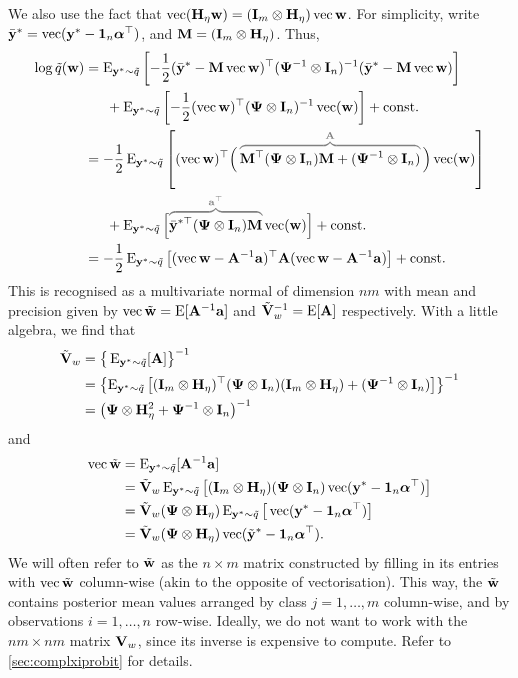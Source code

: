 We also use the fact that $\operatorname{vec} ({\mathbf H}_\eta{\mathbf w}) = ({\mathbf I}_m \otimes {\mathbf H}_\eta)\operatorname{vec}{\mathbf w}$.  %
For simplicity, write $\bar{{\mathbf y}}^* = \operatorname{vec}({\mathbf y}^* - {\mathbf 1}_n{\bm\alpha}^\top)$, and ${\mathbf M} = ({\mathbf I}_m \otimes {\mathbf H}_\eta)$.
Thus,
\begin{align*}
  \log \tilde q(\bw) 
  &= \E_{\by^*\sim \tilde q} \left[ 
  -\half (\bar\by^* - \bM\vecc\bw )^\top(\bPsi^{-1} \otimes \bI_n)^{-1} (\bar\by^* - \bM\vecc\bw )
  \right] \\
  &\phantom{==} + \E_{\by^*\sim \tilde q} \left[ 
  -\half (\vecc \bw )^\top(\bPsi \otimes \bI_n)^{-1} \vecc (\bw ) \right] + \const \\
  &= -\half\E_{\by^*\sim \tilde q} \left[ 
  (\vecc\bw)^\top \Big( \,
  \myoverbrace{\bM^\top(\bPsi \otimes \bI_n)\bM + (\bPsi^{-1} \otimes \bI_n)}{\bA} 
  \, \Big) \vecc (\bw )
  \right] \\
  &\phantom{==} + \E_{\by^*\sim \tilde q} \Big[ 
  \myoverbrace{\bar\by^{*\top} (\bPsi \otimes \bI_n) \bM}{\ba^\top} \vecc (\bw )
  \Big] + \const \\
  &= -\half\E_{\by^*\sim \tilde q} \left[
  (\vecc\bw - \bA^{-1}\ba)^\top \bA (\vecc\bw - \bA^{-1}\ba)
  \right] + \const
\end{align*}
This is recognised as a multivariate normal of dimension $nm$ with mean and precision given by $\operatorname{vec} \tilde{{\mathbf w}} = \operatorname{E}[{\mathbf A}^{-1}{\mathbf a}]$ and $\tilde{{\mathbf V}}_w ^{-1}= \operatorname{E}[{\mathbf A}]$ respectively.
With a little algebra, we find that
\begin{align*}
  \tilde{{\mathbf V}}_w 
  &= \big\{ \operatorname{E}_{{\mathbf y}^*\sim \tilde q} [{\mathbf A}] \big\}^{-1} \\
  &= \left\{ \operatorname{E}_{{\mathbf y}^*\sim \tilde q} \left[({\mathbf I}_m \otimes {\mathbf H}_\eta)^\top({\bm\Psi} \otimes {\mathbf I}_n)({\mathbf I}_m \otimes {\mathbf H}_\eta) + ({\bm\Psi}^{-1} \otimes {\mathbf I}_n) \right] \right\}^{-1} \\
  &= \big( {\bm\Psi} \otimes {\mathbf H}_\eta^2 + {\bm\Psi}^{-1} \otimes {\mathbf I}_n \big)^{-1}
\end{align*}
and 
\begin{align*}
  \operatorname{vec} \tilde{\mathbf w} 
  &= \operatorname{E}_{{\mathbf y}^*\sim \tilde q} [{\mathbf A}^{-1}{\mathbf a}] \\
  &= \tilde{{\mathbf V}}_w \operatorname{E}_{{\mathbf y}^*\sim \tilde q} \big[({\mathbf I}_m \otimes {\mathbf H}_\eta) ({\bm\Psi} \otimes {\mathbf I}_n) \operatorname{vec}({\mathbf y}^* - {\mathbf 1}_n{\bm\alpha}^\top)  \big] \\
  &= \tilde{{\mathbf V}}_w ({\bm\Psi} \otimes {\mathbf H}_\eta) \operatorname{E}_{{\mathbf y}^*\sim \tilde q} \big[\operatorname{vec}({\mathbf y}^* - {\mathbf 1}_n{\bm\alpha}^\top)  \big] \\
  &= \tilde{{\mathbf V}}_w ({\bm\Psi} \otimes {\mathbf H}_\eta) \operatorname{vec}(\tilde{{\mathbf y}}^* - {\mathbf 1}_n{\bm\alpha}^\top).
\end{align*}
We will often refer to $\tilde{{\mathbf w}}$ as the $n\times m$ matrix constructed by filling in its entries with $\operatorname{vec} \tilde{{\mathbf w}}$ column-wise (akin to the opposite of vectorisation).
This way, the $\tilde{{\mathbf w}}$ contains posterior mean values arranged by class $j=1,\dots,m$ column-wise, and by observations $i=1,\dots,n$ row-wise.
Ideally, we do not want to work with the $nm \times nm$ matrix ${\mathbf V}_w$, since its inverse is expensive to compute.
Refer to \cref{sec:complxiprobit} for details.

